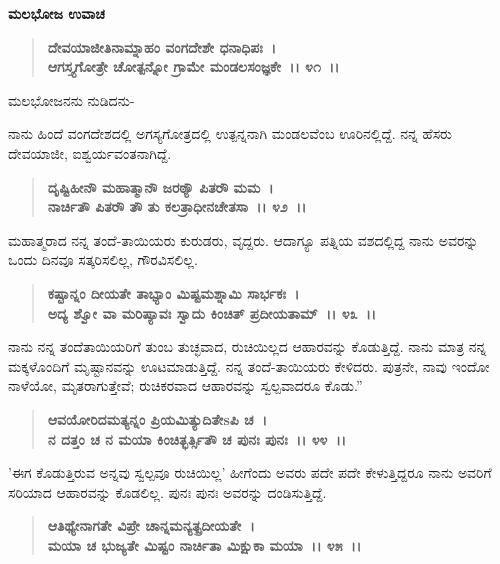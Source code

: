 \begin{flushleft}
\textbf{ಮಲಭೋಜ ಉವಾಚ\enginline{-}}
\end{flushleft}

\begin{verse}
\textbf{ದೇವಯಾಜೀತಿನಾಮ್ನಾಹಂ ವಂಗದೇಶೇ ಧನಾಧಿಪಃ~।}\\\textbf{ಆಗಸ್ತ್ಯಗೋತ್ರೇ ಚೋತ್ಪನ್ನೋ ಗ್ರಾಮೇ ಮಂಡಲಸಂಜ್ಞಕೇ~।। ೪೧~।।}
\end{verse}

\begin{flushleft}
ಮಲಭೋಜನನು ನುಡಿದನು-
\end{flushleft}

ನಾನು ಹಿಂದೆ ವಂಗದೇಶದಲ್ಲಿ ಅಗಸ್ಯಗೋತ್ರದಲ್ಲಿ ಉತ್ಪನ್ನನಾಗಿ ಮಂಡಲವೆಂಬ ಊರಿ\-ನಲ್ಲಿದ್ದೆ. ನನ್ನ ಹೆಸರು ದೇವಯಾಜೀ, ಐಶ್ವರ್ಯವಂತನಾಗಿದ್ದೆ.

\begin{verse}
\textbf{ದೃಷ್ಟಿಹೀನೌ ಮಹಾತ್ಮಾನೌ ಜರಠ್ಯೌ ಪಿತರೌ ಮಮ~।}\\\textbf{ನಾರ್ಚಿತೌ ಪಿತರೌ‌ ತೌ ತು ಕಲತ್ರಾಧೀನಚೇತಸಾ~।। ೪೨~।।}
\end{verse}

ಮಹಾತ್ಮರಾದ ನನ್ನ ತಂದೆ-ತಾಯಿಯರು ಕುರುಡರು, ವೃದ್ದರು. ಆದಾಗ್ಯೂ ಪತ್ನಿಯ ವಶದಲ್ಲಿದ್ದ ನಾನು ಅವರನ್ನು ಒಂದು ದಿನವೂ ಸತ್ಕರಿಸಲಿಲ್ಲ, ಗೌರವಿಸಲಿಲ್ಲ.

\begin{verse}
\textbf{ಕಷ್ಟಾನ್ನಂ ದೀಯತೇ ತಾಭ್ಯಾಂ ಮಿಷ್ಟಮಶ್ನಾಮಿ ಸಾರ್ಭಕಃ~।}\\\textbf{ಅದ್ಯ ಶ್ವೋ ವಾ ಮರಿಷ್ಯಾವಃ ಸ್ವಾದು ಕಿಂಚಿತ್ ಪ್ರದೀಯತಾಮ್~।। ೪೩~।।}
\end{verse}

ನಾನು ನನ್ನ ತಂದೆತಾಯಿಯರಿಗೆ ತುಂಬ ತುಚ್ಛವಾದ, ರುಚಿಯಿಲ್ಲದ ಆಹಾರವನ್ನು ಕೊಡುತ್ತಿದ್ದೆ. ನಾನು ಮಾತ್ರ ನನ್ನ ಮಕ್ಕಳೊಂದಿಗೆ ಮೃಷ್ಟಾನವನ್ನು ಊಟಮಾಡುತ್ತಿದ್ದೆ. ನನ್ನ ತಂದೆ-ತಾಯಿಯರು ಕೇಳಿದರು. ಪುತ್ರನೇ, ನಾವು ಇಂದೋ ನಾಳೆಯೋ, ಮೃತರಾಗುತ್ತೇವೆ; ರುಚಿಕರವಾದ ಆಹಾರವನ್ನು ಸ್ವಲ್ಪವಾದರೂ ಕೊಡು.”

\begin{verse}
\textbf{ಆವಯೋರಿದಮತ್ಯನ್ನಂ ಪ್ರಿಯಮಿತ್ಯುದಿತೇsಪಿ ಚ~।}\\\textbf{ನ ದತ್ತಂ ಚ ನ ಮಯಾ ಕಿಂಚಿತ್ಭರ್ತ್ಸಿತೌ ಚ ಪುನಃ ಪುನಃ~।। ೪೪~।।}
\end{verse}

'ಈಗ ಕೊಡುತ್ತಿರುವ ಅನ್ನವು ಸ್ವಲ್ಪವೂ ರುಚಿಯಿಲ್ಲ' ಹೀಗೆಂದು ಅವರು ಪದೇ ಪದೇ ಕೇಳುತ್ತಿದ್ದರೂ ನಾನು ಅವರಿಗೆ ಸರಿಯಾದ ಆಹಾರವನ್ನು ಕೊಡಲಿಲ್ಲ. ಪುನಃ ಪುನಃ ಅವರನ್ನು ದಂಡಿಸುತ್ತಿದ್ದೆ.

\begin{verse}
\textbf{ಆತಿಥ್ಯೇನಾಗತೇ ವಿಪ್ರೇ ಚಾನ್ನಮನ್ಯತ್ಪ್ರದೀಯತೇ~।}\\\textbf{ಮಯಾ ಚ ಭುಜ್ಯತೇ ಮಿಷ್ಟಂ ನಾರ್ಚಿತಾ ಮಿಕ್ಷುಕಾ ಮಯಾ~।। ೪೫~।।}
\end{verse}


